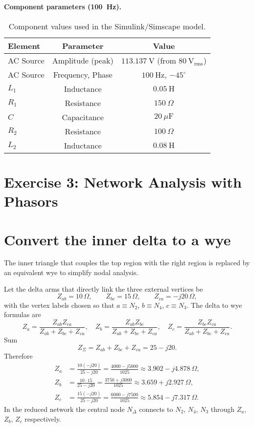 \documentclass{article}
\begin{document}
\paragraph{Component parameters (100~Hz).}
\begin{table}[H]\centering
\begin{tabular}{lcc}
\toprule
Element & Parameter & Value \\
\midrule
AC Source & Amplitude (peak) & $113.137~\text{V}$ \quad (from $80~\text{V}_{\mathrm{rms}}$) \\
AC Source & Frequency, Phase & $100~\text{Hz}$,\; $-45^\circ$ \\
$L_1$ & Inductance & $0.05~\text{H}$ \\
$R_1$ & Resistance & $150~\Omega$ \\
$C$   & Capacitance & $20~\mu\text{F}$ \\
$R_2$ & Resistance & $100~\Omega$ \\
$L_2$ & Inductance & $0.08~\text{H}$ \\
\bottomrule
\end{tabular}
\caption{Component values used in the Simulink/Simscape model.}
\end{table}






\newpage
\section{Exercise 3: Network Analysis with Phasors}


\section*{Convert the inner delta to a wye}
The inner triangle that couples the top region with the right region is replaced by an equivalent wye to simplify nodal analysis.

Let the delta arms that directly link the three external vertices be
\[
Z_{ab}=10\,\Omega,\qquad Z_{bc}=15\,\Omega,\qquad Z_{ca}=-j20\,\Omega,
\]
with the vertex labels chosen so that $a\equiv N_2$, $b\equiv N_4$, $c\equiv N_3$.
The delta to wye formulas are
\[
Z_a=\frac{Z_{ab}Z_{ca}}{Z_{ab}+Z_{bc}+Z_{ca}},
\quad
Z_b=\frac{Z_{ab}Z_{bc}}{Z_{ab}+Z_{bc}+Z_{ca}},
\quad
Z_c=\frac{Z_{bc}Z_{ca}}{Z_{ab}+Z_{bc}+Z_{ca}}.
\]
Sum
\[
Z_{\Sigma}=Z_{ab}+Z_{bc}+Z_{ca}=25-j20.
\]
Therefore
\[
\begin{aligned}
Z_{a}&=\frac{10(-j20)}{25-j20}=\frac{4000 - j5000}{1025}
\approx 3.902 - j4.878\ \Omega,\\[1mm]
Z_{b}&=\frac{10\cdot 15}{25-j20}=\frac{3750 + j3000}{1025}
\approx 3.659 + j2.927\ \Omega,\\[1mm]
Z_{c}&=\frac{15(-j20)}{25-j20}=\frac{6000 - j7500}{1025}
\approx 5.854 - j7.317\ \Omega.
\end{aligned}
\]
In the reduced network the central node $N_{\Delta}$ connects to $N_2$, $N_4$, $N_3$ through $Z_a$, $Z_b$, $Z_c$ respectively.
\end{document}
